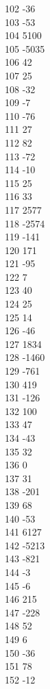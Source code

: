 { 102	-36 \\
 103	-53 \\
 104	5100 \\
 105	-5035 \\
 106	42 \\
 107	25 \\
 108	-32 \\
 109	-7 \\
 110	-76 \\
 111	27 \\
 112	82 \\
 113	-72 \\
 114	-10 \\
 115	25 \\
 116	33 \\
 117	2577 \\
 118	-2574 \\
 119	-141 \\
 120	171 \\
 121	-95 \\
 122	7 \\
 123	40 \\
 124	25 \\
 125	14 \\
 126	-46 \\
 127	1834 \\
 128	-1460 \\
 129	-761 \\
 130	419 \\
 131	-126 \\
 132	100 \\
 133	47 \\
 134	-43 \\
 135	32 \\
 136	0 \\
 137	31 \\
 138	-201 \\
 139	68 \\
 140	-53 \\
 141	6127 \\
 142	-5213 \\
 143	-821 \\
 144	-3 \\
 145	-6 \\
 146	215 \\
 147	-228 \\
 148	52 \\
 149	6 \\
 150	-36 \\
 151	78 \\
 152	-12 \\
}
